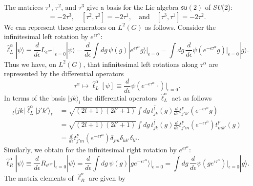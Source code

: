 \documentclass[12pt]{amsart}
\def\su2{\textsl{SU}(2)}
\def\lasu2{\mathfrak{su}(2)}
\theoremstyle{definition}
\theoremstyle{remark}
\numberwithin{equation}{section}
\begin{document}
The matrices $\tau^1$,  $\tau^2$, and $\tau^3$ give a basis for the Lie algebra $\lasu2$ of \su2:
\begin{equation}
	[\tau^1, \tau^2] = -2\tau^3, \quad [\tau^2, \tau^3] = -2\tau^1, \quad \text{and} \quad [\tau^3, \tau^1] = -2\tau^2.
\end{equation}
We can represent these generators on $L^2(G)$ as follows. Consider the infinitesimal left rotation by $e^{\epsilon \tau^\alpha}$:
\begin{equation}
	\widehat{\ell}^\alpha_{L}|\psi\rangle \equiv \frac{d}{d\epsilon} L_{e^{\epsilon \tau^\alpha}}\Big|_{\epsilon=0}|\psi\rangle = \frac{d}{d\epsilon}\int dg \, \psi(g) | e^{\epsilon \tau^\alpha}g\rangle \Big|_{\epsilon=0}=  \int dg \, \frac{d}{d\epsilon}\psi(e^{-\epsilon \tau^\alpha}g)\Big|_{\epsilon=0} | g\rangle.
\end{equation}
Thus we have, on $L^2(G)$, that infinitesimal left rotations along $\tau^\alpha$ are represented by the differential operators
\begin{equation}
	\tau^\alpha \mapsto \widehat{\ell}^\alpha_L[\psi] \equiv  \frac{d}{d\epsilon}\psi(e^{-\epsilon \tau^\alpha}\cdot)\Big|_{\epsilon=0}.
\end{equation}
In terms of the basis $|jk\rangle_l$ the differential operators $\widehat{\ell}^\alpha_L$ act as follows
\begin{equation}
	\begin{split}
		{_l\langle jk|}\widehat{\ell}^\alpha_L|j'k'\rangle_{l'} &= \sqrt{(2l+1)(2l'+1)}\int dg\,   \overline{t^l_{jk}}(g)\frac{d}{d\epsilon} t_{j'k'}^{l'}(e^{-\epsilon \tau^\alpha}g)   \\
	 &= \sqrt{(2l+1)(2l'+1)}\int dg\,   \overline{t^l_{jk}}(g)\frac{d}{d\epsilon} t_{j'm}^{l'}(e^{-\epsilon \tau^\alpha})t_{m k'}^{l'}(g) \\
	 &= \frac{d}{d\epsilon} t_{j'm}^{l'}(e^{-\epsilon \tau^\alpha}) \delta_{jm}\delta_{kk'}\delta_{ll'}.
	\end{split}
\end{equation}
Similarly, we obtain for the infinitesimal right rotation by $e^{\epsilon \tau^\alpha}$:
\begin{equation}
	\widehat{\ell}^\alpha_{R}|\psi\rangle \equiv \frac{d}{d\epsilon} R_{e^{\epsilon \tau^\alpha}}\Big|_{\epsilon=0}|\psi\rangle = \frac{d}{d\epsilon}\int dg \, \psi(g) | ge^{-\epsilon \tau^\alpha}\rangle \Big|_{\epsilon=0}=  \int dg \, \frac{d}{d\epsilon}\psi(ge^{\epsilon \tau^\alpha})\Big|_{\epsilon=0} | g\rangle.
\end{equation}
The matrix elements of $\widehat{\ell}^\alpha_{R}$ are given by
\end{document}
